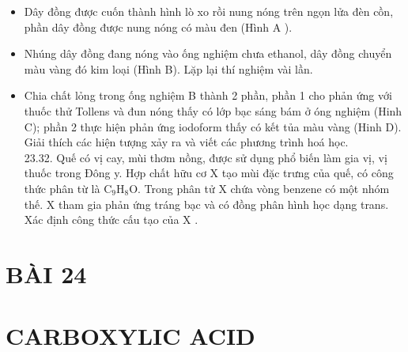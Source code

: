 \documentclass[10pt]{article}
\begin{document}
\begin{itemize}
  \item Dây đồng được cuốn thành hình lò xo rồi nung nóng trên ngọn lửa đèn cồn, phần dây đồng được nung nóng có màu đen (Hình A ).
  \item Nhúng dây đồng đang nóng vào ống nghiệm chưa ethanol, dây đồng chuyển màu vàng đó kim loại (Hình B). Lặp lại thí nghiệm vài lần.
  \item Chia chất lỏng trong ống nghiệm B thành 2 phần, phần 1 cho phản ứng với thuốc thử Tollens và đun nóng thấy có lớp bạc sáng bám ở óng nghiệm (Hinh C); phần 2 thực hiện phản ứng iodoform thấy có kết tủa màu vàng (Hinh D).\\
Giải thích các hiện tượng xảy ra và viết các phương trình hoá học.\\
23.32. Quế có vị cay, mùi thơm nồng, được sử dụng phổ biến làm gia vị, vị thuốc trong Đông y. Hợp chất hữu cơ X tạo mùi đặc trưng của quế, có công thức phân từ là $\mathrm{C}_{9} \mathrm{H}_{8} \mathrm{O}$. Trong phân tử X chứa vòng benzene có một nhóm thế. X tham gia phản ứng tráng bạc và có đồng phân hình học dạng trans. Xác định công thức cấu tạo của X .
\end{itemize}

\section*{BÀI 24}
\section*{CARBOXYLIC ACID}
\end{document}
